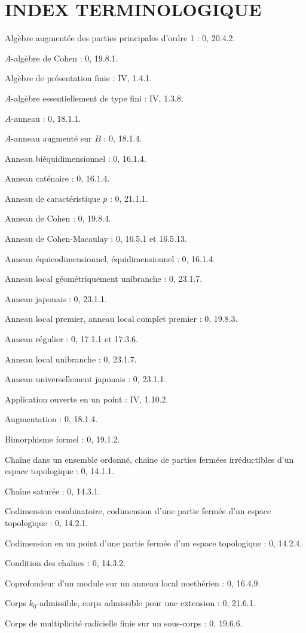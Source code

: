 \clearpage
{}
{}
\section*{INDEX TERMINOLOGIQUE}

Algèbre augmentée des parties principales d'ordre 1 : 0, 20.4.2.\par
$A$-algèbre de Cohen : 0, 19.8.1.\par
Algèbre de présentation finie : IV, 1.4.1.\par
$A$-algèbre essentiellement de type fini : IV, 1.3.8.\par
$A$-anneau : 0, 18.1.1.\par
$A$-anneau augmenté sur $B$ : 0, 18.1.4.\par
Anneau biéquidimensionnel : 0, 16.1.4.\par
Anneau caténaire : 0, 16.1.4.\par
Anneau de caractéristique $p$ : 0, 21.1.1.\par
Anneau de Cohen : 0, 19.8.4.\par
Anneau de Cohen-Macaulay : 0, 16.5.1 et 16.5.13.\par
Anneau équicodimensionnel, équidimensionnel : 0, 16.1.4.\par
Anneau local géométriquement unibranche : 0, 23.1.7.\par
Anneau japonais : 0, 23.1.1.\par
Anneau local premier, anneau local complet premier : 0, 19.8.3.\par
Anneau régulier : 0, 17.1.1 et 17.3.6.\par
Anneau local unibranche : 0, 23.1.7.\par
Anneau universellement japonais : 0, 23.1.1.\par
Application ouverte en un point : IV, 1.10.2.\par
Augmentation : 0, 18.1.4.\par

Bimorphisme formel : 0, 19.1.2.\par

Chaîne dans un ensemble ordonné, chaîne de parties fermées irréductibles d'un espace topologique : 0, 14.1.1.\par
Chaîne saturée : 0, 14.3.1.\par
Codimension combinatoire, codimension d'une partie fermée d'un espace topologique : 0, 14.2.1.\par
Codimension en un point d'une partie fermée d'un espace topologique : 0, 14.2.4.\par
Condition des chaînes : 0, 14.3.2.\par
Coprofondeur d'un module sur un anneau local noethérien : 0, 16.4.9.\par
Corps $k_0$-admissible, corps admissible pour une extension : 0, 21.6.1.\par
Corps de multiplicité radicielle finie sur un sous-corps : 0, 19.6.6.\par

